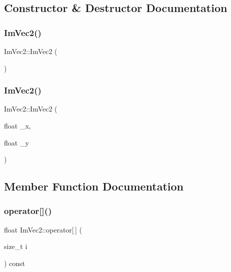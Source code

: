 \subsection{Constructor \& Destructor Documentation}
\mbox{\label{struct_im_vec2_a5dfa5ab27cc4af6df3cf8d920fc8a294}} 
\subsubsection{\texorpdfstring{Im\+Vec2()}{ImVec2()}\hspace{0.1cm}{\footnotesize\ttfamily [1/2]}}
{\footnotesize\ttfamily Im\+Vec2\+::\+Im\+Vec2 (\begin{DoxyParamCaption}{ }\end{DoxyParamCaption})\hspace{0.3cm}{\ttfamily [inline]}}

\mbox{\label{struct_im_vec2_af2fd51a6c4bf6290676b235533b92c0d}} 
\subsubsection{\texorpdfstring{Im\+Vec2()}{ImVec2()}\hspace{0.1cm}{\footnotesize\ttfamily [2/2]}}
{\footnotesize\ttfamily Im\+Vec2\+::\+Im\+Vec2 (\begin{DoxyParamCaption}\item[{float}]{\+\_\+x,  }\item[{float}]{\+\_\+y }\end{DoxyParamCaption})\hspace{0.3cm}{\ttfamily [inline]}}



\subsection{Member Function Documentation}
\mbox{\label{struct_im_vec2_a91ff3f28020c492f202587b3a1236966}} 
\subsubsection{\texorpdfstring{operator[]()}{operator[]()}}
{\footnotesize\ttfamily float Im\+Vec2\+::operator\mbox{[}$\,$\mbox{]} (\begin{DoxyParamCaption}\item[{size\+\_\+t}]{i }\end{DoxyParamCaption}) const\hspace{0.3cm}{\ttfamily [inline]}}



